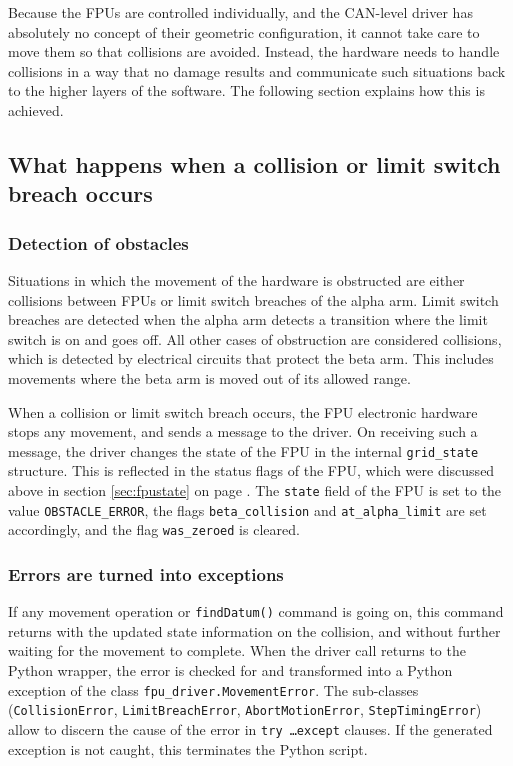 \documentclass[11pt,a4paper]{scrartcl}
\begin{document}
Because the FPUs are controlled individually, and the CAN-level driver
has absolutely no concept of their geometric configuration, it cannot
take care to move them so that collisions are avoided.  Instead, the
hardware needs to handle collisions in a way that no damage results
and communicate such situations back to the higher layers of the
software. The following section explains how this is achieved.

\subsection{What happens when a collision or limit switch breach occurs}
\subsubsection{Detection of obstacles}

Situations in which the movement of the hardware is obstructed are
either collisions between FPUs or limit switch breaches of the alpha
arm. Limit switch breaches are detected when the alpha arm detects a
transition where the limit switch is on and goes off. All other cases
of obstruction are considered collisions, which is detected by
electrical circuits that protect the beta arm. This includes movements
where the beta arm is moved out of its allowed range.

When a collision or limit switch breach occurs, the FPU electronic
hardware stops any movement, and sends a message to the driver. On
receiving such a message, the driver changes the state of the FPU in
the internal \texttt{grid\_state} structure. This is reflected in the
status flags of the FPU, which were discussed above in section
\ref{sec:fpustate} on page \pageref{sec:fpustate}.  The \texttt{state}
field of the FPU is set to the value \texttt{OBSTACLE\_ERROR}, the
flags \texttt{beta\_collision} and \texttt{at\_alpha\_limit} are set
accordingly, and the flag \texttt{was\_zeroed} is cleared.


\subsubsection{Errors are turned into exceptions}

\begin{sloppypar}
If any movement operation or \texttt{findDatum()} command is going on,
this command returns with the updated state information on the
collision, and without further waiting for the movement to complete.
When the driver call returns to the Python wrapper, the error is
checked for and transformed into a Python exception of the class
\texttt{fpu\_driver.MovementError}. The sub-classes
(\texttt{CollisionError}, \texttt{LimitBreachError},
\texttt{AbortMotionError}, \texttt{StepTimingError}) allow to discern
the cause of the error in \texttt{try \ldots except} clauses.  If the
generated exception is not caught, this terminates the Python script.
\end{sloppypar}
\end{document}
